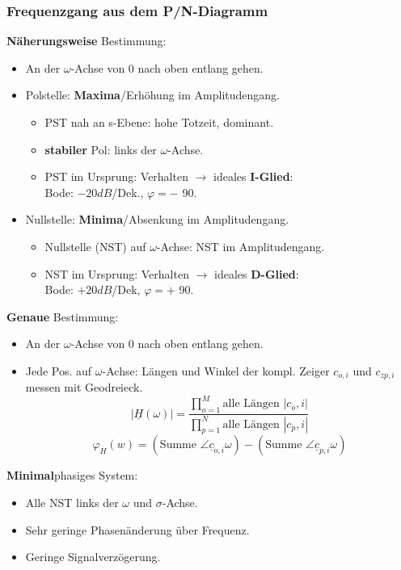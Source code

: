 \subsubsection{Frequenzgang aus dem P/N-Diagramm}
\textbf{Näherungsweise} Bestimmung:
\begin{itemize}
\item An der $\omega$-Achse von 0 nach oben entlang gehen.
\item Polstelle: \textbf{Maxima}/Erhöhung im Amplitudengang.
\begin{itemize}
	\item PST nah an s-Ebene: hohe Totzeit, dominant.
	\item \textbf{stabiler} Pol: links der $\omega$-Achse.
	\item PST im Ursprung: Verhalten $\rightarrow$ ideales \textbf{I-Glied}:\\ Bode: $-20dB$/Dek., $\varphi=-$ 90\textdegree.
\end{itemize}
\item Nullstelle: \textbf{Minima}/Absenkung im Amplitudengang.
\begin{itemize}
	\item Nullstelle (NST) auf $\omega$-Achse: NST im Amplitudengang.
	\item NST im Ursprung: Verhalten $\rightarrow$ ideales \textbf{D-Glied}:\\ Bode: $+20dB$/Dek, $ \varphi=+$ 90\textdegree.
\end{itemize}

\end{itemize}
\textbf{Genaue} Bestimmung:
\begin{itemize}
	\item An der $\omega$-Achse von 0 nach oben entlang gehen.
	\item Jede Pos. auf $\omega$-Achse: Längen und Winkel der kompl. Zeiger $c_{o,i}$ und $c_{zp,i}$ messen mit Geodreieck.
	\[
	|\underline{H}(\omega)|=\frac{\prod_{o=1}^{M}\text{alle Längen } |c_o,i|}{\prod_{p=1}^{N}\text{alle Längen } |c_p,i|}
	\]
	\[
	\varphi_H(w)=(\text{Summe } \angle \underline{c}_{o,i}{\omega})-(\text{Summe } \angle \underline{c}_{p,i}{\omega})
	\]
\end{itemize}
\textbf{Minimal}phasiges System:
\begin{itemize}
	\item Alle NST links der $\omega$ und $\sigma$-Achse.
	\item Sehr geringe Phasen\"anderung \"uber Frequenz.
	\item Geringe Signalverz\"ogerung.
\end{itemize}

